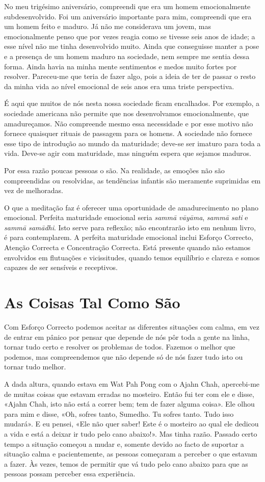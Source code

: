 No meu trigésimo aniversário, compreendi que era um homem emocionalmente
subdesenvolvido. Foi um aniversário importante para mim, compreendi que era um
homem feito e maduro. Já não me considerava um jovem, mas emocionalmente penso
que por vezes reagia como se tivesse seis anos de idade; a esse nível não me
tinha desenvolvido muito. Ainda que conseguisse manter a pose e a presença de um
homem maduro na sociedade, nem sempre me sentia dessa forma. Ainda havia na
minha mente sentimentos e medos muito fortes por resolver. Pareceu-me que teria
de fazer algo, pois a ideia de ter de passar o resto da minha vida ao nível
emocional de seis anos era uma triste perspectiva.

É aqui que muitos de nós nesta nossa sociedade ficam encalhados. Por exemplo, a
sociedade americana não permite que nos desenvolvamos emocionalmente, que
amadureçamos. Não compreende mesmo essa necessidade e por esse motivo não
fornece quaisquer rituais de passagem para os homens. A sociedade não fornece
esse tipo de introdução ao mundo da maturidade; deve-se ser imaturo para toda a
vida. Deve-se agir com maturidade, mas ninguém espera que sejamos maduros.

Por essa razão poucas pessoas o são. Na realidade, as emoções não são
compreendidas ou resolvidas, as tendências infantis são meramente suprimidas em
vez de melhoradas.

O que a meditação faz é oferecer uma oportunidade de amadurecimento no plano
emocional. Perfeita maturidade emocional seria \emph{sammā vāyāma}, \emph{sammā
  sati} e \emph{sammā samādhi}. Isto serve para reflexão; não encontrarão isto
em nenhum livro, é para contemplarem. A perfeita maturidade emocional inclui
Esforço Correcto, Atenção Correcta e Concentração Correcta. Está presente quando
não estamos envolvidos em flutuações e vicissitudes, quando temos equilíbrio e
clareza e somos capazes de ser sensíveis e receptivos.

\section{As Coisas Tal Como São}

Com Esforço Correcto podemos aceitar as diferentes situações com calma, em vez
de entrar em pânico por pensar que depende de nós pôr toda a gente na linha,
tornar tudo certo e resolver os problemas de todos. Fazemos o melhor que
podemos, mas compreendemos que não depende só de nós fazer tudo isto ou tornar
tudo melhor.

A dada altura, quando estava em Wat Pah Pong com o Ajahn Chah, apercebi-me de
muitas coisas que estavam erradas no mosteiro. Então fui ter com ele e disse,
«Ajahn Chah, isto não está a correr bem; tem de fazer alguma coisa». Ele olhou
para mim e disse, «Oh, sofres tanto, Sumedho. Tu sofres tanto. Tudo isso
mudará». E eu pensei, «Ele não quer saber! Este é o mosteiro ao qual ele dedicou
a vida e está a deixar ir tudo pelo cano abaixo!». Mas tinha razão. Passado
certo tempo a situação começou a mudar e, somente devido ao facto de suportar a
situação calma e pacientemente, as pessoas começaram a perceber o que estavam a
fazer. Às vezes, temos de permitir que vá tudo pelo cano abaixo para que as
pessoas possam perceber essa experiência.

